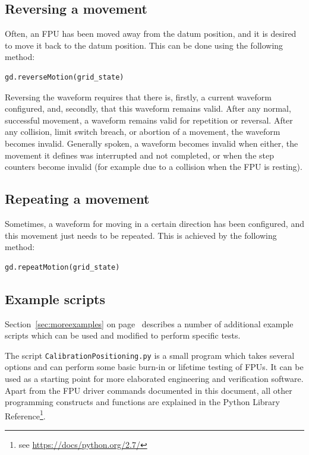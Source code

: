 \documentclass[11pt,a4paper]{scrartcl}
\begin{document}
\subsection{Reversing a movement}
Often, an FPU has been moved away from the datum position, and it is
desired to move it back to the datum position.  This can be done using
the following method:

\begin{verbatim}
gd.reverseMotion(grid_state)
\end{verbatim}

Reversing the waveform requires that there is, firstly, a current
waveform configured, and, secondly, that this waveform remains valid.
After any normal, successful movement, a waveform remains valid for
repetition or reversal. After any collision, limit switch breach, or
abortion of a movement, the waveform becomes invalid. Generally
spoken, a waveform becomes invalid when either, the movement it
defines was interrupted and not completed, or when the step counters
become invalid (for example due to a collision when the FPU is
resting).


\subsection{Repeating a movement}
Sometimes, a waveform for moving in a certain direction has been
configured, and this movement just needs to be repeated.  This is
achieved by the following method:

\begin{verbatim}
gd.repeatMotion(grid_state)
\end{verbatim}

\subsection{Example scripts}

Section~\ref{sec:moreexamples} on page~\pageref{sec:moreexamples}
describes a number of additional example scripts which can be used and
modified to perform specific tests.

The script \texttt{CalibrationPositioning.py} is a small program which
takes several options and can perform some basic burn-in or lifetime
testing of FPUs. It can be used as a starting point for more
elaborated engineering and verification software. Apart from the FPU
driver commands documented in this document, all other programming
constructs and functions are explained in the Python Library
Reference\footnote{see \url{https://docs/python.org/2.7/}}.
\end{document}
